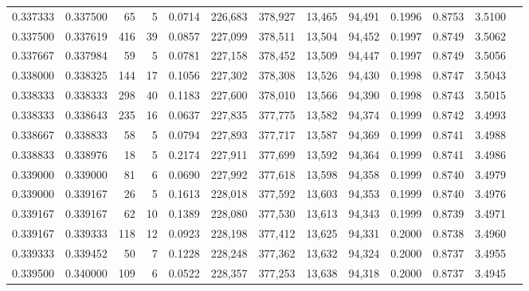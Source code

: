 \begin{tabular}{rrrrrrrrrrrrr}
0.337333 & 0.337500 &    65 &   5 &                                     0.0714 & 226,683 & 378,927 &  13,465 &  94,491 & 0.1996 & 0.8753 & 3.5100 \\
0.337500 & 0.337619 &   416 &  39 &                                     0.0857 & 227,099 & 378,511 &  13,504 &  94,452 & 0.1997 & 0.8749 & 3.5062 \\
0.337667 & 0.337984 &    59 &   5 &                                     0.0781 & 227,158 & 378,452 &  13,509 &  94,447 & 0.1997 & 0.8749 & 3.5056 \\
0.338000 & 0.338325 &   144 &  17 &                                     0.1056 & 227,302 & 378,308 &  13,526 &  94,430 & 0.1998 & 0.8747 & 3.5043 \\
0.338333 & 0.338333 &   298 &  40 &                                     0.1183 & 227,600 & 378,010 &  13,566 &  94,390 & 0.1998 & 0.8743 & 3.5015 \\
0.338333 & 0.338643 &   235 &  16 &                                     0.0637 & 227,835 & 377,775 &  13,582 &  94,374 & 0.1999 & 0.8742 & 3.4993 \\
0.338667 & 0.338833 &    58 &   5 &                                     0.0794 & 227,893 & 377,717 &  13,587 &  94,369 & 0.1999 & 0.8741 & 3.4988 \\
0.338833 & 0.338976 &    18 &   5 &                                     0.2174 & 227,911 & 377,699 &  13,592 &  94,364 & 0.1999 & 0.8741 & 3.4986 \\
0.339000 & 0.339000 &    81 &   6 &                                     0.0690 & 227,992 & 377,618 &  13,598 &  94,358 & 0.1999 & 0.8740 & 3.4979 \\
0.339000 & 0.339167 &    26 &   5 &                                     0.1613 & 228,018 & 377,592 &  13,603 &  94,353 & 0.1999 & 0.8740 & 3.4976 \\
0.339167 & 0.339167 &    62 &  10 &                                     0.1389 & 228,080 & 377,530 &  13,613 &  94,343 & 0.1999 & 0.8739 & 3.4971 \\
0.339167 & 0.339333 &   118 &  12 &                                     0.0923 & 228,198 & 377,412 &  13,625 &  94,331 & 0.2000 & 0.8738 & 3.4960 \\
0.339333 & 0.339452 &    50 &   7 &                                     0.1228 & 228,248 & 377,362 &  13,632 &  94,324 & 0.2000 & 0.8737 & 3.4955 \\
0.339500 & 0.340000 &   109 &   6 &                                     0.0522 & 228,357 & 377,253 &  13,638 &  94,318 & 0.2000 & 0.8737 & 3.4945 \\

\end{tabular}
